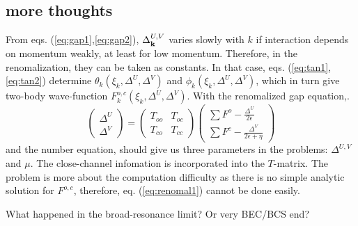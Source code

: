 \subsection{more thoughts}
From eqs. (\ref{eq:gap1},\ref{eq:gap2}), $\Delta^{U,V}_{\mathbf{k}}$ varies slowly with $k$ if interaction depends on momentum weakly, at least for low momentum.  Therefore, in the renomalization, they can be taken as constants.  In that case, eqs. (\ref{eq:tan1},\ref{eq:tan2}) determine $\theta_k(\xi_k,\Delta^U,\Delta^V)$ and $\phi_k(\xi_k,\Delta^U,\Delta^V)$, which in turn give two-body wave-function $F^{o,c}_k(\xi_k,\Delta^U,\Delta^V)$.  
With the renomalized gap equation,.  
\begin{equation}\label{eq:renomal1}
\begin{pmatrix}\Delta^U\\\Delta^V\end{pmatrix}=\begin{pmatrix}T_{oo}&T_{oc}\\T_{co}&T_{cc}\end{pmatrix}
\begin{pmatrix}\sum{F^o-\frac{\Delta^U}{2\epsilon}}\\\sum{F^c-\frac{\Delta^V}{2\epsilon+\eta}}\end{pmatrix}
\end{equation}
and the number equation, should give us three parameters in the problems: $\Delta^{U,V}$ and $\mu$.  The close-channel infomation is incorporated into the $T$-matrix.  The problem is more about the computation difficulty as there is no simple analytic solution for $F^{o,c}$, therefore, eq. (\ref{eq:renomal1}) cannot be done easily.

What happened in the broad-resonance limit? Or very BEC/BCS end? 

